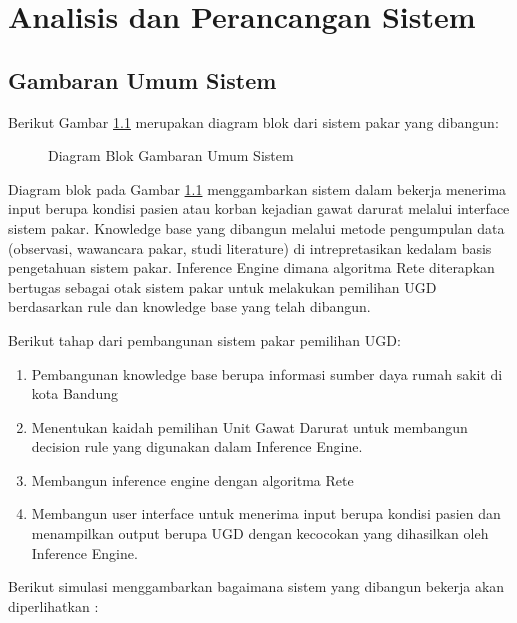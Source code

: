 \chapter{Analisis dan Perancangan Sistem}

\section{Gambaran Umum Sistem}
Berikut Gambar \ref{fig:GambaranUmum} merupakan diagram blok dari sistem pakar yang dibangun:

\begin{figure}[h]	
	{\par}
	\caption{Diagram Blok Gambaran Umum Sistem}
	\label{fig:GambaranUmum}
\end{figure}
Diagram blok pada Gambar \ref{fig:GambaranUmum} menggambarkan sistem dalam bekerja menerima input berupa kondisi pasien atau korban kejadian gawat darurat melalui interface sistem pakar. Knowledge base yang dibangun melalui metode pengumpulan data (observasi, wawancara pakar, studi literature) di intrepretasikan kedalam basis pengetahuan sistem pakar. Inference Engine dimana algoritma Rete diterapkan bertugas sebagai otak sistem pakar untuk melakukan pemilihan UGD berdasarkan rule dan knowledge base yang telah dibangun. \par
Berikut tahap dari pembangunan sistem pakar pemilihan UGD:
\begin{enumerate}
	\item Pembangunan knowledge base berupa informasi sumber daya rumah sakit di kota Bandung
	\item Menentukan kaidah pemilihan Unit Gawat Darurat untuk membangun decision rule yang digunakan dalam Inference Engine.
	\item Membangun inference engine dengan algoritma Rete
	\item Membangun user interface untuk menerima input berupa kondisi pasien dan menampilkan output berupa UGD dengan kecocokan yang dihasilkan oleh Inference Engine.
\end{enumerate} 
\par
Berikut simulasi menggambarkan bagaimana sistem yang dibangun bekerja akan diperlihatkan : 

